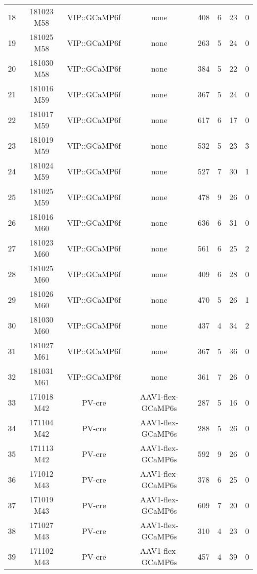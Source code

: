\begin{table}[htbp]
\begin{tabular}{lccccccc}
    18    & 181023 M58 & VIP::GCaMP6f & none  & 408   & 6     & 23    & 0 \\
    19    & 181025 M58 & VIP::GCaMP6f & none  & 263   & 5     & 24    & 0 \\
    20    & 181030 M58 & VIP::GCaMP6f & none  & 384   & 5     & 22    & 0 \\
    21    & 181016 M59 & VIP::GCaMP6f & none  & 367   & 5     & 24    & 0 \\
    22    & 181017 M59 & VIP::GCaMP6f & none  & 617   & 6     & 17    & 0 \\
    23    & 181019 M59 & VIP::GCaMP6f & none  & 532   & 5     & 23    & 3 \\
    24    & 181024 M59 & VIP::GCaMP6f & none  & 527   & 7     & 30    & 1 \\
    25    & 181025 M59 & VIP::GCaMP6f & none  & 478   & 9     & 26    & 0 \\
    26    & 181016 M60 & VIP::GCaMP6f & none  & 636   & 6     & 31    & 0 \\
    27    & 181023 M60 & VIP::GCaMP6f & none  & 561   & 6     & 25    & 2 \\
    28    & 181025 M60 & VIP::GCaMP6f & none  & 409   & 6     & 28    & 0 \\
    29    & 181026 M60 & VIP::GCaMP6f & none  & 470   & 5     & 26    & 1 \\
    30    & 181030 M60 & VIP::GCaMP6f & none  & 437   & 4     & 34    & 2 \\
    31    & 181027 M61 & VIP::GCaMP6f & none  & 367   & 5     & 36    & 0 \\
    32    & 181031 M61 & VIP::GCaMP6f & none  & 361   & 7     & 26    & 0 \\
    33    & 171018 M42 & PV-cre & AAV1-flex-GCaMP6s & 287   & 5     & 16    & 0 \\
    34    & 171104 M42 & PV-cre & AAV1-flex-GCaMP6s & 288   & 5     & 26    & 0 \\
    35    & 171113 M42 & PV-cre & AAV1-flex-GCaMP6s & 592   & 9     & 26    & 0 \\
    36    & 171012 M43 & PV-cre & AAV1-flex-GCaMP6s & 378   & 6     & 25    & 0 \\
    37    & 171019 M43 & PV-cre & AAV1-flex-GCaMP6s & 609   & 7     & 20    & 0 \\
    38    & 171027 M43 & PV-cre & AAV1-flex-GCaMP6s & 310   & 4     & 23    & 0 \\
    39    & 171102 M43 & PV-cre & AAV1-flex-GCaMP6s & 457   & 4     & 39    & 0 \\

\end{tabular}
\end{table}
